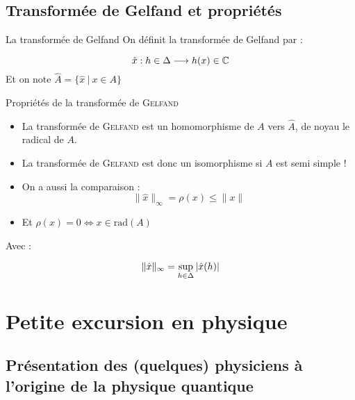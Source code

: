 \documentclass[11pt, xcolor=table]{beamer}
\begin{document}
\subsection{Transformée de Gelfand et propriétés}

\begin{frame}{La transformée de Gelfand}
    On définit la transformée de Gelfand par :
    \begin{mydef}
        \[
            \hat{x} : h \in \Delta \longrightarrow h(x) \in \mathbb{C} 
        \]
        Et on note $\hat{A} = \{ \hat{x} \ | \ x \in A \}$
    \end{mydef}
\end{frame}

\begin{frame}
    \begin{myth}{Propriétés de la transformée de \textsc{Gelfand}}
        \begin{itemize}
            \item La transformée de \textsc{Gelfand} est un homomorphisme de $A$ vers $\hat{A}$, de noyau le radical de $A$.
            \item La transformée de \textsc{Gelfand} est donc un isomorphisme si $A$ est semi simple !
                \item On a aussi la comparaison :
                    \[
                        \| \hat{x} \|_{\infty} = \rho(x) \leq \| x \|
                    \]
                \item Et $\rho(x) = 0 \iff x \in \mathrm{rad}(A) $
        \end{itemize}
        \end{myth}

        Avec :
        \begin{mydef}
            \[
                \| \hat{x} \|_{\infty} = \sup_{h \in \Delta } | \hat{x}(h) |
            \]
        \end{mydef}
\end{frame}


\section{Petite excursion en physique}

\subsection{Présentation des (quelques) physiciens à l'origine de la physique quantique}
\end{document}

